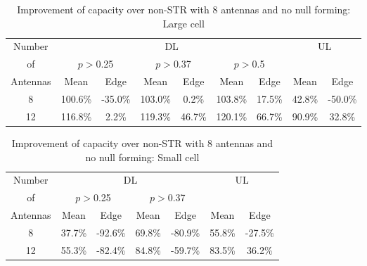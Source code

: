 \documentclass[twocolumn]{IEEEtran}
\begin{document}
\begin{center}
\begin{table*}[ht]
\centering \caption{Improvement of capacity over non-STR with 8
antennas and no null forming: Large cell}
\begin{small}
\begin{tabular}{c||c|c|c|c|c|c||c|c}
\hline
  \hline
Number &\multicolumn{6}{c||}{DL}  &\multicolumn{2}{c}{UL}  \\
    \cline{2-9}
 of  & \multicolumn{2}{c|}{$p>$0.25} & \multicolumn{2}{c|}{$p>$0.37} & \multicolumn{2}{c||}{$p>$0.5} & \multicolumn{2}{c}{}  \\
\cline{2-9}
 Antennas & Mean & Edge & Mean & Edge & Mean & Edge & Mean & Edge\\
  \hline
  \hline
  8 & 100.6\% &-35.0\% & 103.0\% & 0.2\% & 103.8\% & 17.5\% & 42.8\% &-50.0\% \\
 12 & 116.8\% &  2.2\% & 119.3\% & 46.7\%& 120.1\% & 66.7\% & 90.9\% & 32.8\%   \\
\hline \hline
\end{tabular}
\end{small}
\end{table*}
\end{center}

\begin{center}
\begin{table*}[ht]
\centering \caption{Improvement of capacity over non-STR with 8
antennas and no null forming: Small cell}
\begin{small}
\begin{tabular}{c||c|c|c|c||c|c}
\hline
  \hline
Number &\multicolumn{4}{c||}{DL}  &\multicolumn{2}{c}{UL}  \\
    \cline{2-7}
 of   & \multicolumn{2}{c|}{$p>$0.25} & \multicolumn{2}{c||}{$p>$0.37} & \multicolumn{2}{c}{}\\
\cline{2-7}
 Antennas & Mean & Edge & Mean & Edge & Mean & Edge \\
  \hline
  \hline
  8 & 37.7\% & -92.6\% & 69.8\% & -80.9\% & 55.8\% & -27.5\%  \\
 12 & 55.3\% & -82.4\% & 84.8\% & -59.7\% & 83.5\% &  36.2\%  \\
\hline \hline
\end{tabular}
\end{small}
\end{table*}
\end{center}
\end{document}
